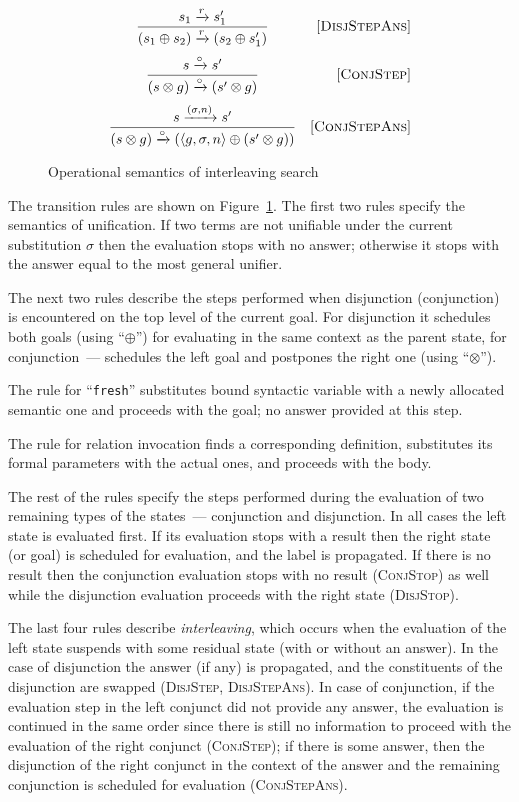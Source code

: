 \begin{figure}
\[\begin{array}{cr}
    \dfrac{s_1 \xrightarrow{r} s'_1}{(s_1 \oplus s_2) \xrightarrow{r} (s_2 \oplus s'_1)} &\mbox{[\textsc{DisjStepAns}]}\\[5mm]
    \dfrac{s \xrightarrow{\circ} s'}{(s \otimes g) \xrightarrow{\circ} (s' \otimes g)} &\mbox{[\textsc{ConjStep}]}\\[5mm]
    \dfrac{s \xrightarrow{(\sigma, n)} s'}{(s \otimes g) \xrightarrow{\circ} (\left<{g, \sigma, n}\right> \oplus (s' \otimes g))} & \mbox{[\textsc{ConjStepAns}]} 
  \end{array}
  \]
  \caption{Operational semantics of interleaving search}
  \label{lts}
\end{figure}

The transition rules are shown on Figure~\ref{lts}. The first two rules specify the semantics of unification. If two terms are not unifiable under the current substitution
$\sigma$ then the evaluation stops with no answer; otherwise it stops with the answer equal to the most general unifier.

The next two rules describe the steps performed when disjunction (conjunction) is encountered on the top level of the current goal. For disjunction it schedules both goals (using ``$\oplus$'') for
evaluating in the same context as the parent state, for conjunction~--- schedules the left goal and postpones the right one (using ``$\otimes$'').

The rule for ``\lstinline|fresh|'' substitutes bound syntactic variable with a newly allocated semantic one and proceeds with the goal; no answer provided at this step.

The rule for relation invocation finds a corresponding definition, substitutes its formal parameters with the actual ones, and proceeds with the body.

The rest of the rules specify the steps performed during the evaluation of two remaining types of the states~--- conjunction and disjunction. In all cases the left state
is evaluated first. If its evaluation stops with a result then the right state (or goal) is scheduled for evaluation, and the label is propagated. If there is no result then
the conjunction evaluation stops with no result (\textsc{ConjStop}) as well while the disjunction evaluation proceeds with the right state (\textsc{DisjStop}).

The last four rules describe \emph{interleaving}, which occurs when the evaluation of the left state suspends with some residual state (with or without an answer). In the case of disjunction
the answer (if any) is propagated, and the constituents of the disjunction are swapped (\textsc{DisjStep}, \textsc{DisjStepAns}). In case of conjunction, if the evaluation step in
the left conjunct did not provide any answer, the evaluation is continued in the same order since there is still no information to proceed with the evaluation of the right
conjunct (\textsc{ConjStep}); if there is some answer, then the disjunction of the right conjunct in the context of the answer and the remaining conjunction is
scheduled for evaluation (\textsc{ConjStepAns}).

